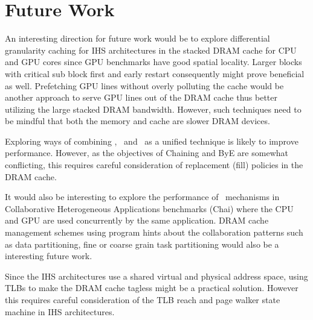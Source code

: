 \section{Future Work}
An interesting direction for future work would be to explore differential granularity caching for IHS architectures in the stacked DRAM cache for CPU and GPU cores since GPU benchmarks have good spatial locality. Larger blocks with critical sub block first and early restart \cite{dram-book} consequently might prove beneficial as well. Prefetching GPU lines without overly polluting the cache would be another approach to serve GPU lines out of the DRAM cache thus better utilizing the large stacked DRAM bandwidth. However, such techniques need to be mindful that both the memory and cache are slower DRAM devices. 
\par Exploring ways of combining \prioname, \chaining\ and \bypassname\ as a unified technique is likely to improve performance. However, as the objectives of Chaining and ByE are somewhat conflicting, this requires careful consideration of replacement (fill) policies in the DRAM cache.
\par It would also be interesting to explore the performance of \cachename\ mechanisms in Collaborative Heterogeneous Applications benchmarks (Chai) \cite{chai} where the CPU and GPU are used concurrently by the same application. DRAM cache management schemes using program hints about the collaboration patterns such as data partitioning, fine or coarse grain task partitioning would also be a interesting future work.
\par Since the IHS architectures use a shared virtual and physical address space, using TLBs to make the DRAM cache tagless might be a practical solution. However this requires careful consideration of the TLB reach and page walker state machine in IHS architectures.
